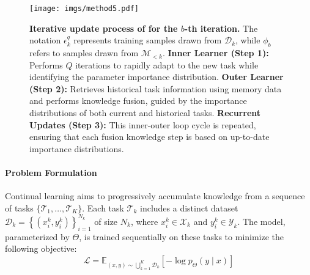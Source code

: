 
\begin{figure*}[t]
  \centering
  \texttt{[image: imgs/method5.pdf]}
  \caption{\textbf{Iterative update process of {\ouralg} for the $b$-th iteration.} 
  The notation $\epsilon_{k}^q$ represents training samples drawn from $\mathcal{D}_k$, while $\phi_{b}$ refers to samples drawn from $\mathcal{M}_{<k}$.
  \textbf{Inner Learner (Step 1):} Performs $Q$ iterations to rapidly adapt to the new task while identifying the parameter importance distribution.
    \textbf{Outer Learner (Step 2):} Retrieves historical task information using memory data and performs knowledge fusion, guided by the importance distributions of both current and historical tasks. 
    \textbf{Recurrent Updates (Step 3):} This inner-outer loop cycle is repeated, ensuring that each fusion knowledge step is based on up-to-date importance distributions.
  }
  \label{fig:method}
\end{figure*}




\paragraph{Problem Formulation}
Continual learning aims to progressively accumulate knowledge from a sequence of tasks $\{\mathcal{T}_1, \ldots, \mathcal{T}_K\}$. Each task $\mathcal{T}_k$ includes a distinct dataset $\mathcal{D}_k = \left\{ \left( x_i^k, y_i^k \right) \right\}_{i=1}^{N_k}$ of size $N_k$, where $x_i^k \in \mathcal{X}_k$ and $y_i^k \in \mathcal{Y}_k$.
The model, parameterized by $\Theta$, is trained sequentially on these tasks to minimize the following objective:
\begin{equation}
\mathcal{L} = \mathbb{E}_{(x, y) \sim \bigcup_{k=1}^K \mathcal{D}_k} \left[ -\log p_\Theta(y \mid x) \right]
\end{equation}

